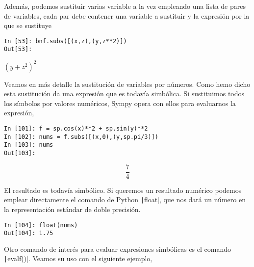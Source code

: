 \begin{paracol}{2}
Además, podemos sustituir varias variable a la vez empleando una lista de pares de variables, cada par debe contener una variable a sustituir y la expresión por la que se sustituye
\end{paracol}
\begin{center}
	\begin{minipage}{.25\textwidth}
		\begin{verbatim}
In [53]: bnf.subs([(x,z),(y,z**2)])
Out[53]:
		\end{verbatim}
		$(y+z^2)^2$
	\end{minipage}
\end{center}
\begin{paracol}{2}
Veamos en más detalle la sustitución de variables por números. Como hemo dicho esta sustitución da una expresión que es todavía simbólica. Si sustituimos todos los símbolos por valores numéricos, Sympy opera con ellos para evaluarnos la expresión,
\end{paracol}
\begin{center}
	\begin{minipage}{.5\textwidth}
		\begin{verbatim}
In [101]: f = sp.cos(x)**2 + sp.sin(y)**2
In [102]: nums = f.subs([(x,0),(y,sp.pi/3)])
In [103]: nums
Out[103]:
		\end{verbatim}
		\begin{equation*} \frac{7}{4}\end{equation*}
	\end{minipage}
\end{center}
\begin{paracol}{2}
El resultado es todavía simbólico. Si queremos un resultado numérico podemos emplear directamente el comando de Python \texttt|float|, que nos dará un número en la representación estándar de doble precisión. 
\end{paracol}
\begin{center}
	\begin{minipage}{.5\textwidth}
		\begin{verbatim}
In [104]: float(nums)
Out[104]: 1.75
		\end{verbatim}
	\end{minipage}
\end{center}
\begin{paracol}{2}
Otro comando de interés para evaluar expresiones simbólicas es el comando \texttt|evalf()|. Veamos su uso con el siguiente ejemplo,
\end{paracol}

